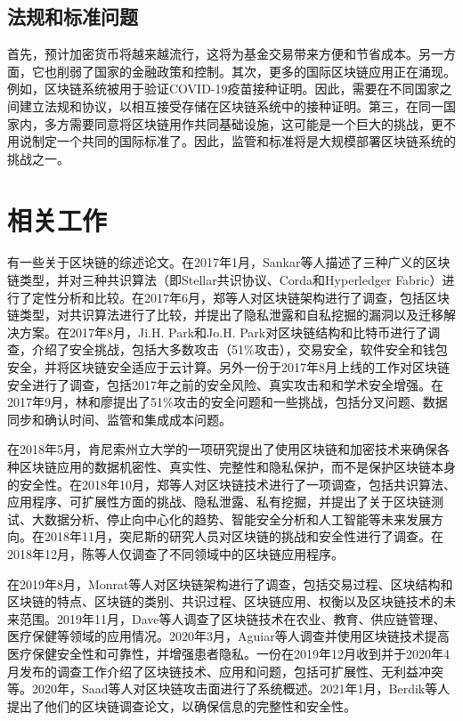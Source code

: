 \begin{translation}
\subsection{法规和标准问题}
首先，预计加密货币将越来越流行，这将为基金交易带来方便和节省成本。另一方面，它也削弱了国家的金融政策和控制。其次，更多的国际区块链应用正在涌现。例如，区块链系统被用于验证COVID-19疫苗接种证明。因此，需要在不同国家之间建立法规和协议，以相互接受存储在区块链系统中的接种证明。第三，在同一国家内，多方需要同意将区块链用作共同基础设施，这可能是一个巨大的挑战，更不用说制定一个共同的国际标准了。因此，监管和标准将是大规模部署区块链系统的挑战之一。

\section{相关工作}
有一些关于区块链的综述论文。在2017年1月，Sankar等人描述了三种广义的区块链类型，并对三种共识算法（即Stellar共识协议、Corda和Hyperledger Fabric）进行了定性分析和比较\cite{art26}。在2017年6月，郑等人对区块链架构进行了调查，包括区块链类型，对共识算法进行了比较，并提出了隐私泄露和自私挖掘的漏洞以及迁移解决方案\cite{art27}。在2017年8月，Ji.H. Park和Jo.H. Park对区块链结构和比特币进行了调查，介绍了安全挑战，包括大多数攻击（51\%攻击），交易安全，软件安全和钱包安全，并将区块链安全适应于云计算\cite{art55}。另外一份于2017年8月上线的工作对区块链安全进行了调查，包括2017年之前的安全风险、真实攻击和和学术安全增强。在2017年9月，林和廖提出了51\%攻击的安全问题和一些挑战，包括分叉问题、数据同步和确认时间、监管和集成成本问题\cite{art2}。

在2018年5月，肯尼索州立大学的一项研究提出了使用区块链和加密技术来确保各种区块链应用的数据机密性、真实性、完整性和隐私保护，而不是保护区块链本身的安全性\cite{art28}。在2018年10月，郑等人对区块链技术进行了一项调查，包括共识算法、应用程序、可扩展性方面的挑战、隐私泄露、私有挖掘，并提出了关于区块链测试、大数据分析、停止向中心化的趋势、智能安全分析和人工智能等未来发展方向\cite{art3}。在2018年11月，突尼斯的研究人员对区块链的挑战和安全性进行了调查\cite{art146}。在2018年12月，陈等人仅调查了不同领域中的区块链应用程序\cite{art43}。

在2019年8月，Monrat等人对区块链架构进行了调查，包括交易过程、区块结构和区块链的特点、区块链的类别、共识过程、区块链应用、权衡以及区块链技术的未来范围\cite{art45}。2019年11月，Dave等人调查了区块链技术在农业、教育、供应链管理、医疗保健等领域的应用情况\cite{art44}。2020年3月，Aguiar等人调查并使用区块链技术提高医疗保健安全性和可靠性，并增强患者隐私\cite{art30}。一份在2019年12月收到并于2020年4月发布的调查工作介绍了区块链技术、应用和问题，包括可扩展性、无利益冲突等\cite{art31}。2020年，Saad等人对区块链攻击面进行了系统概述\cite{art147}。2021年1月，Berdik等人提出了他们的区块链调查论文，以确保信息的完整性和安全性\cite{art32}。


\end{translation}
